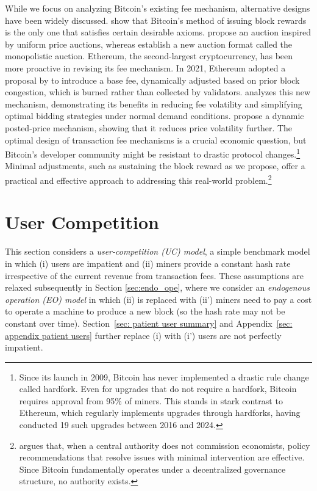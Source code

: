 \documentclass[12pt, letterpaper]{article}
\begin{document}
While we focus on analyzing Bitcoin’s existing fee mechanism, alternative designs have been widely discussed. 
\citet{Chen2019axiomatic} show that Bitcoin's method of issuing block rewards is the only one that satisfies certain desirable axioms.
\citet{basu2023towards} propose an auction inspired by uniform price auctions, whereas \citet{lavi2022redesigning} establish a new auction format called the monopolistic auction. Ethereum, the second-largest cryptocurrency, has been more proactive in revising its fee mechanism. In 2021, Ethereum adopted a proposal by \citet{eip1559} to introduce a base fee, dynamically adjusted based on prior block congestion, which is burned rather than collected by validators. \citet{roughgarden2021transaction,roughgarden2024transaction} analyzes this new mechanism, demonstrating its benefits in reducing fee volatility and simplifying optimal bidding strategies under normal demand conditions. \citet{ferreira2021dynamic} propose a dynamic posted-price mechanism, showing that it reduces price volatility further. The optimal design of transaction fee mechanisms is a crucial economic question, but Bitcoin’s developer community might be resistant to drastic protocol changes.\footnote{Since its launch in 2009, Bitcoin has never implemented a drastic rule change called hardfork. Even for upgrades that do not require a hardfork, Bitcoin requires approval from 95\% of miners. This stands in stark contrast to Ethereum, which regularly implements upgrades through hardforks, having conducted 19 such upgrades between 2016 and 2024.}
Minimal adjustments, such as sustaining the block reward as we propose, offer a practical and effective approach to addressing this real-world problem.\footnote{\citet{sonmez2023minimalist} argues that, when a central authority does not commission economists, policy recommendations that resolve issues with minimal intervention are effective. Since Bitcoin fundamentally operates under a decentralized governance structure, no authority exists.}


\section{User Competition}

This section considers a \emph{user-competition (UC) model}, a simple benchmark model in which (i) users are impatient and (ii) miners provide a constant hash rate irrespective of the current revenue from transaction fees. These assumptions are relaxed subsequently in Section \ref{sec:endo_ope}, where we consider an \emph{endogenous operation (EO) model} in which (ii) is replaced with (ii') miners need to pay a cost to operate a machine to produce a new block (so the hash rate may not be constant over time). Section~\ref{sec: patient user summary} and Appendix~\ref{sec: appendix patient users} further replace (i) with  (i') users are not perfectly impatient.
\end{document}
